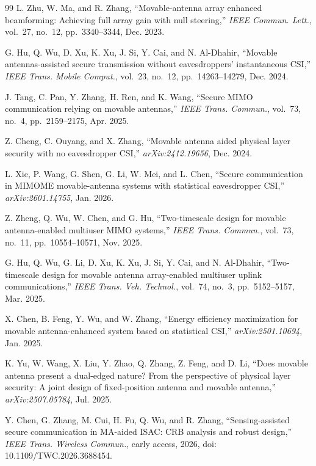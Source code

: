 \documentclass[journal]{IEEEtran}
\begin{document}
\begin{thebibliography}{99}
L. Zhu, W. Ma, and R. Zhang, ``Movable-antenna array enhanced beamforming: Achieving full array gain with null steering,'' \emph{IEEE Commun. Lett.}, vol.~27, no.~12, pp.~3340--3344, Dec. 2023.

G. Hu, Q. Wu, D. Xu, K. Xu, J. Si, Y. Cai, and N. Al-Dhahir, ``Movable antennas-assisted secure transmission without eavesdroppers' instantaneous CSI,'' \emph{IEEE Trans. Mobile Comput.}, vol.~23, no.~12, pp.~14263--14279, Dec. 2024.

J. Tang, C. Pan, Y. Zhang, H. Ren, and K. Wang, ``Secure MIMO communication relying on movable antennas,'' \emph{IEEE Trans. Commun.}, vol.~73, no.~4, pp.~2159--2175, Apr. 2025.

Z. Cheng, C. Ouyang, and X. Zhang, ``Movable antenna aided physical layer security with no eavesdropper CSI,'' \emph{arXiv:2412.19656}, Dec. 2024.

L. Xie, P. Wang, G. Shen, G. Li, W. Mei, and L. Chen, ``Secure communication in MIMOME movable-antenna systems with statistical eavesdropper CSI,'' \emph{arXiv:2601.14755}, Jan. 2026.

Z. Zheng, Q. Wu, W. Chen, and G. Hu, ``Two-timescale design for movable antenna-enabled multiuser MIMO systems,'' \emph{IEEE Trans. Commun.}, vol.~73, no.~11, pp.~10554--10571, Nov. 2025.

G. Hu, Q. Wu, G. Li, D. Xu, K. Xu, J. Si, Y. Cai, and N. Al-Dhahir, ``Two-timescale design for movable antenna array-enabled multiuser uplink communications,'' \emph{IEEE Trans. Veh. Technol.}, vol.~74, no.~3, pp.~5152--5157, Mar. 2025.

X. Chen, B. Feng, Y. Wu, and W. Zhang, ``Energy efficiency maximization for movable antenna-enhanced system based on statistical CSI,'' \emph{arXiv:2501.10694}, Jan. 2025.

K. Yu, W. Wang, X. Liu, Y. Zhao, Q. Zhang, Z. Feng, and D. Li, ``Does movable antenna present a dual-edged nature? From the perspective of physical layer security: A joint design of fixed-position antenna and movable antenna,'' \emph{arXiv:2507.05784}, Jul. 2025.

Y. Chen, G. Zhang, M. Cui, H. Fu, Q. Wu, and R. Zhang, ``Sensing-assisted secure communication in MA-aided ISAC: CRB analysis and robust design,'' \emph{IEEE Trans. Wireless Commun.}, early access, 2026, doi: 10.1109/TWC.2026.3688454.


\end{thebibliography}
\end{document}
